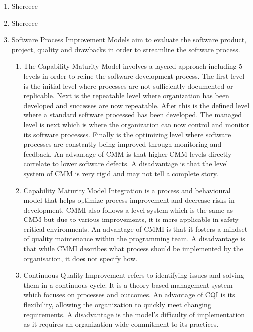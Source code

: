 \documentclass{article}
\begin{document}
\begin{enumerate}
\begin{enumerate}
       
   \end{enumerate}
   
   \item Shereece
   \item Shereece
   
   \item Software Process Improvement Models aim to evaluate the software product, project, quality and drawbacks in order to streamline the software process.
   \begin{enumerate}
       

    \item The Capability Maturity Model involves a layered approach including 5 levels in order to refine the software development process. The first level is the initial level where processes are not sufficiently documented or replicable. Next is the repeatable level where organization has been developed and successes are now repeatable. After this is the defined level where a standard software processed has been developed. The managed level is next which is where the organization can now control and monitor its software processes. Finally is the optimizing level where software processes are constantly being improved through monitoring and feedback. An advantage of CMM is that higher CMM levels directly correlate to lower software defects. A disadvantage is that the level system of CMM is very rigid and may not tell a complete story.
    
    \item  Capability Maturity Model Integration is a process and behavioural model that helps optimize process improvement and decrease risks in development. CMMI also follows a level system which is the same as CMM but due to various improvements, it is more applicable in safety critical environments. An advantage of CMMI is that it fosters a mindset of quality maintenance within the programming team. A disadvantage is that while CMMI describes what process should be implemented by the organisation, it does not specify how. 
    
    \item Continuous Quality Improvement refers to identifying issues and solving them in a continuous cycle. It is a theory-based management system which focuses on processes and outcomes. An advantage of CQI is its flexibility, allowing the organization to quickly meet changing requirements. A disadvantage is the model’s difficulty of implementation as it requires an organization wide commitment to its practices.
    

\end{enumerate}
\end{enumerate}
\end{document}
